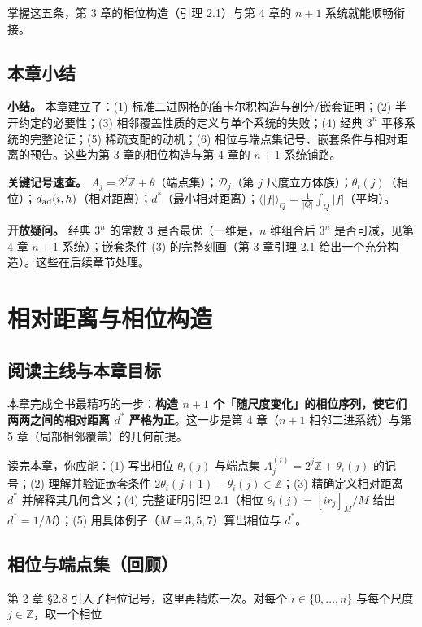 \documentclass[a4paper,11pt,openany]{ctexbook}
\numberwithin{equation}{chapter}
\numberwithin{figure}{chapter}
\numberwithin{table}{chapter}
\begin{document}
掌握这五条，第 3 章的相位构造（引理 2.1）与第 4 章的 $n+1$ 系统就能顺畅衔接。

\section{本章小结}

\textbf{小结。} 本章建立了：(1) 标准二进网格的笛卡尔积构造与剖分/嵌套证明；(2) 半开约定的必要性；(3) 相邻覆盖性质的定义与单个系统的失败；(4) 经典 $3^n$ 平移系统的完整论证；(5) 稀疏支配的动机；(6) 相位与端点集记号、嵌套条件与相对距离的预告。这些为第 3 章的相位构造与第 4 章的 $n+1$ 系统铺路。

\textbf{关键记号速查。} $A_j=2^j\mathbb Z+\theta$（端点集）；$\mathcal D_j$（第 $j$ 尺度立方体族）；$\theta_i(j)$（相位）；$d_{\rm ad}(i,h)$（相对距离）；$d^*$（最小相对距离）；$\langle|f|\rangle_Q=\frac1{|Q|}\int_Q|f|$（平均）。

\textbf{开放疑问。} 经典 $3^n$ 的常数 $3$ 是否最优（一维是，$n$ 维组合后 $3^n$ 是否可减，见第 4 章 $n+1$ 系统）；嵌套条件 (3) 的完整刻画（第 3 章引理 2.1 给出一个充分构造）。这些在后续章节处理。


\clearpage

\chapter{相对距离与相位构造}
\section{阅读主线与本章目标}

本章完成全书最精巧的一步：\textbf{构造 $n+1$ 个「随尺度变化」的相位序列，使它们两两之间的相对距离 $d^*$ 严格为正}。这一步是第 4 章（$n+1$ 相邻二进系统）与第 5 章（局部相邻覆盖）的几何前提。

读完本章，你应能：(1) 写出相位 $\theta_i(j)$ 与端点集 $A_j^{(i)}=2^j\mathbb Z+\theta_i(j)$ 的记号；(2) 理解并验证嵌套条件 $2\theta_i(j+1)-\theta_i(j)\in\mathbb Z$；(3) 精确定义相对距离 $d^*$ 并解释其几何含义；(4) 完整证明引理 2.1（相位 $\theta_i(j)=[ir_j]_M/M$ 给出 $d^*=1/M$）；(5) 用具体例子（$M=3,5,7$）算出相位与 $d^*$。

\section{相位与端点集（回顾）}

第 2 章 §2.8 引入了相位记号，这里再精炼一次。对每个 $i\in\{0,\dots,n\}$ 与每个尺度 $j\in\mathbb Z$，取一个相位
\end{document}
